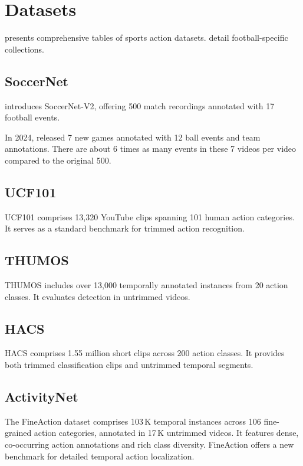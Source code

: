 \section{Datasets}
\label{sec:datasets}

\textcite{survey_of_survey} presents comprehensive tables of sports action datasets. \textcite{seweryn_survey_2023} detail football-specific collections.

\subsection{SoccerNet}

\textcite{deliege_soccernet-v2_dataset_2021} introduces SoccerNet-V2, offering 500 match recordings annotated with 17 football events.

In 2024, \textcite{deliege_soccernet-v2_dataset_2021} released 7 new games annotated with 12 ball events and team annotations. There are about 6 times as many events in these 7 videos per video compared to the original 500. 

\subsection{UCF101}
UCF101 \cite{dataset:UCF101} comprises 13,320 YouTube clips spanning 101 human action categories. It serves as a standard benchmark for trimmed action recognition.

\subsection{THUMOS}
THUMOS \cite{dataset:thumos} includes over 13,000 temporally annotated instances from 20 action classes. It evaluates detection in untrimmed videos.

\subsection{HACS}
HACS \cite{dataset:hacs} comprises 1.55 million short clips across 200 action classes. It provides both trimmed classification clips and untrimmed temporal segments.

\subsection{ActivityNet}
The FineAction dataset \cite{dataset:fineaction} comprises 103\,K temporal instances across 106 fine-grained action categories, annotated in 17\,K untrimmed videos. It features dense, co-occurring action annotations and rich class diversity. FineAction offers a new benchmark for detailed temporal action localization.


